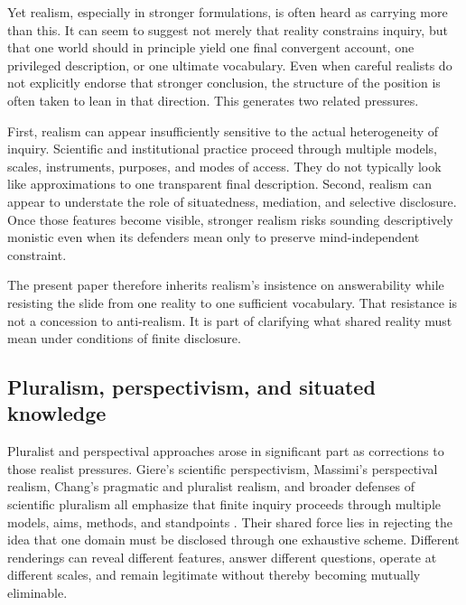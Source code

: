 \documentclass[11pt]{article}
\begin{document}
Yet realism, especially in stronger formulations, is often heard as carrying more than this. It can seem to suggest not merely that reality constrains inquiry, but that one world should in principle yield one final convergent account, one privileged description, or one ultimate vocabulary. Even when careful realists do not explicitly endorse that stronger conclusion, the structure of the position is often taken to lean in that direction. This generates two related pressures.

First, realism can appear insufficiently sensitive to the actual heterogeneity of inquiry. Scientific and institutional practice proceed through multiple models, scales, instruments, purposes, and modes of access. They do not typically look like approximations to one transparent final description. Second, realism can appear to understate the role of situatedness, mediation, and selective disclosure. Once those features become visible, stronger realism risks sounding descriptively monistic even when its defenders mean only to preserve mind-independent constraint.

The present paper therefore inherits realism's insistence on answerability while resisting the slide from one reality to one sufficient vocabulary. That resistance is not a concession to anti-realism. It is part of clarifying what shared reality must mean under conditions of finite disclosure.

\subsection{Pluralism, perspectivism, and situated knowledge}

Pluralist and perspectival approaches arose in significant part as corrections to those realist pressures. Giere's scientific perspectivism, Massimi's perspectival realism, Chang's pragmatic and pluralist realism, and broader defenses of scientific pluralism all emphasize that finite inquiry proceeds through multiple models, aims, methods, and standpoints \cite{Giere2006ScientificPerspectivism,Brown2009ModelsPerspectives,Massimi2012ScientificPerspectivismFoes,Massimi2022PerspectivalRealism,Chang2012IsWaterH2O,Chang2022RealismForRealisticPeople,Veit2020ModelPluralism,Ludwig2021ScientificPluralismSEP}. Their shared force lies in rejecting the idea that one domain must be disclosed through one exhaustive scheme. Different renderings can reveal different features, answer different questions, operate at different scales, and remain legitimate without thereby becoming mutually eliminable.
\end{document}
